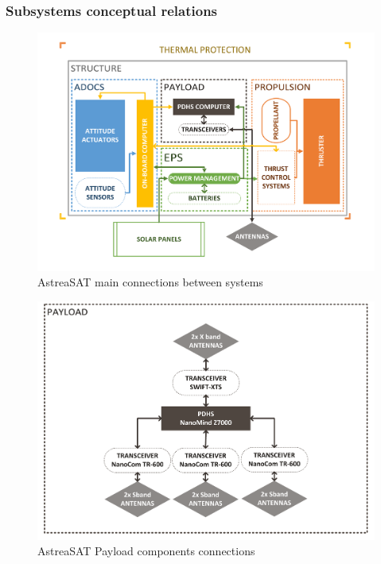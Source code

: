 \subsubsection{Subsystems conceptual relations}
\begin{landscape}
	\begin{figure}[h]
		\centering
		\includegraphics[scale=0.8]{./sections/SatelliteConfiguration/ESQUEMA_ASTREASAT}
		\caption{AstreaSAT main connections between systems}
	\end{figure}
	\begin{figure}[h]
		\centering
		\includegraphics[scale=0.8]{./sections/SatelliteConfiguration/Payload_detail}
		\caption{AstreaSAT Payload components connections}
	\end{figure}
\end{landscape}
\clearpage
%
%


